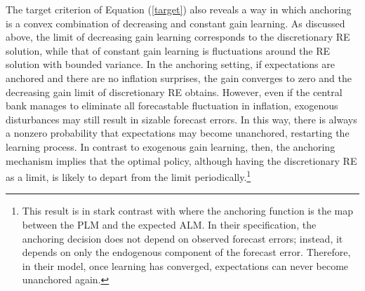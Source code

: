 \documentclass[11pt]{article}
\renewcommand{\[}{\begin{equation}}
\renewcommand{\]}{\end{equation}}
\begin{document}
The target criterion of Equation (\ref{target}) also reveals a way in which anchoring is a convex combination of decreasing and constant gain learning. As discussed above, the limit of decreasing gain learning corresponds to the discretionary RE solution, while that of constant gain learning is fluctuations around the RE solution with bounded variance. In the anchoring setting, if expectations are anchored and there are no inflation surprises, the gain converges to zero and the decreasing gain limit of discretionary RE obtains. However, even if the central bank manages to eliminate all forecastable fluctuation in inflation, exogenous disturbances may still result in sizable forecast errors. In this way, there is always a nonzero probability that expectations may become unanchored, restarting the learning process. In contrast to exogenous gain learning, then, the anchoring mechanism implies that the optimal policy, although having the discretionary RE as a limit, is likely to depart from the limit periodically.\footnote{This result is in stark contrast with \cite{carvalho2019anchored} where the anchoring function is the map between the PLM and the expected ALM. In their specification, the anchoring decision does not depend on observed forecast errors; instead, it depends on only the endogenous component of the forecast error. Therefore, in their model, once learning has converged, expectations can never become unanchored again.}
\end{document}
